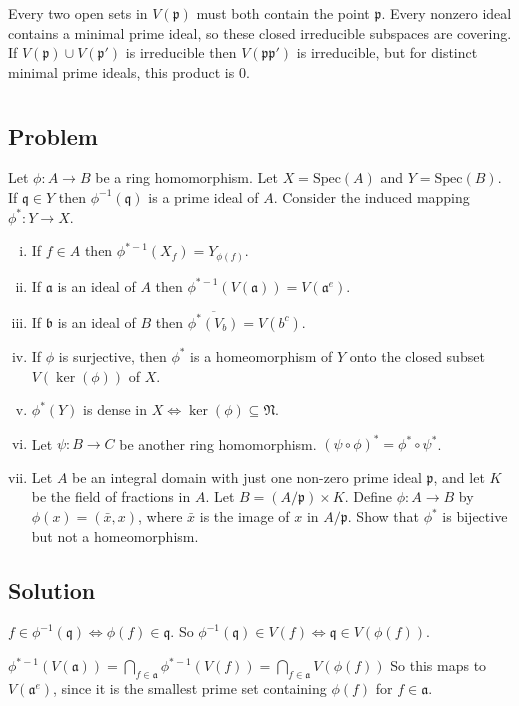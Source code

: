 \documentclass[book,12pt,oneside,openany]{memoir}
\begin{document}
Every two open sets in $V(\mathfrak p)$ must both contain the point
$\mathfrak p$.
Every nonzero ideal contains a minimal prime ideal, so these closed
irreducible subspaces are covering.
If $V(\mathfrak p) \cup V(\mathfrak p')$ is irreducible then
$V(\mathfrak{pp'})$ is irreducible, but for distinct minimal prime
ideals, this product is $0$.

\section{}
\subsection{Problem}
Let $\phi:A\to B$ be a ring homomorphism.
Let $X=\text{Spec}(A)$ and $Y=\text{Spec}(B)$.
If $\mathfrak q\in Y$ then $\phi^{-1}(\mathfrak q)$ is a prime ideal of $A$.
Consider the induced mapping $\phi^* : Y \to X$.
\begin{enumerate}[i)]
\item If $f\in A$ then $\phi^{*-1}(X_f)=Y_{\phi(f)}$.
\item If $\mathfrak a$ is an ideal of $A$ then
$\phi^{*-1}(V(\mathfrak a))=V(\mathfrak a^e)$.
\item If $\mathfrak b$ is an ideal of $B$ then
$\overline{\phi^*(V_b)}=V(b^c)$.
\item If $\phi$ is surjective, then $\phi^*$ is a homeomorphism of $Y$
onto the closed subset $V(\ker(\phi))$ of $X$.
\item $\phi^*(Y)$ is dense in $X \iff \ker(\phi)\subseteq \mathfrak N$.
\item Let $\psi:B\to C$ be another ring homomorphism.
$(\psi\circ\phi)^*=\phi^*\circ\psi^*$.
\item Let $A$ be an integral domain with just one non-zero prime ideal
$\mathfrak p$, and let $K$ be the field of fractions in $A$.
Let $B=(A/\mathfrak p)\times K$.
Define $\phi : A \to B$ by $\phi(x)=(\bar{x},x)$,
where $\bar{x}$ is the image of $x$ in $A/\mathfrak p$.
Show that $\phi^*$ is bijective but not a homeomorphism.
\end{enumerate}
\subsection{Solution}
$f\in \phi^{-1}(\mathfrak q) \iff \phi(f)\in \mathfrak q$.
So $\phi^{-1}(\mathfrak q)\in V(f)\iff \mathfrak q\in V(\phi(f))$.

$\phi^{*-1}(V(\mathfrak a)) = \bigcap_{f\in \mathfrak a} \phi^{*-1}(V(f))
= \bigcap_{f\in \mathfrak a} V(\phi(f))$
So this maps to $V(\mathfrak a^e)$, since it is the smallest prime set
containing $\phi(f)$ for $f\in\mathfrak a$.
\end{document}
